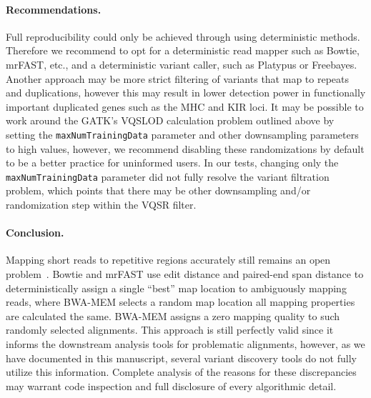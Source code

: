 \documentclass{bioinfo}
\begin{document}
\paragraph{Recommendations.}
 Full reproducibility could only be achieved through using deterministic methods. Therefore we recommend to opt for a deterministic read mapper such as Bowtie, mrFAST, etc., and a deterministic
variant caller, such as Platypus or Freebayes. Another approach may be more strict filtering of variants that map to repeats and duplications, however this may result in lower detection power in functionally important duplicated genes such as the MHC and KIR loci.
 It may be possible to work around the GATK's VQSLOD calculation problem outlined above by setting the {\tt maxNumTrainingData} parameter and other downsampling parameters to high values, however, we recommend disabling these randomizations by default to be a better practice for uninformed users. In our tests, changing only the {\tt maxNumTrainingData} parameter did not fully resolve the variant filtration problem, which points that there may be other downsampling and/or randomization step within the VQSR filter.


\paragraph{Conclusion.}

Mapping short reads to repetitive regions accurately still remains an open problem~\citep{Treangen2012}. Bowtie and mrFAST use 
edit distance and paired-end span distance 
to deterministically assign a single ``best'' map location to ambiguously mapping reads, where BWA-MEM selects a random map location all mapping properties are calculated the same. BWA-MEM assigns a zero mapping quality
to such randomly selected alignments. This approach is still perfectly valid since it informs the downstream analysis tools for problematic alignments, however, as we have documented in this manuscript, 
several variant discovery tools do not fully utilize this information. Complete analysis of the reasons for these discrepancies may warrant code inspection and full disclosure of every algorithmic detail.
\end{document}
